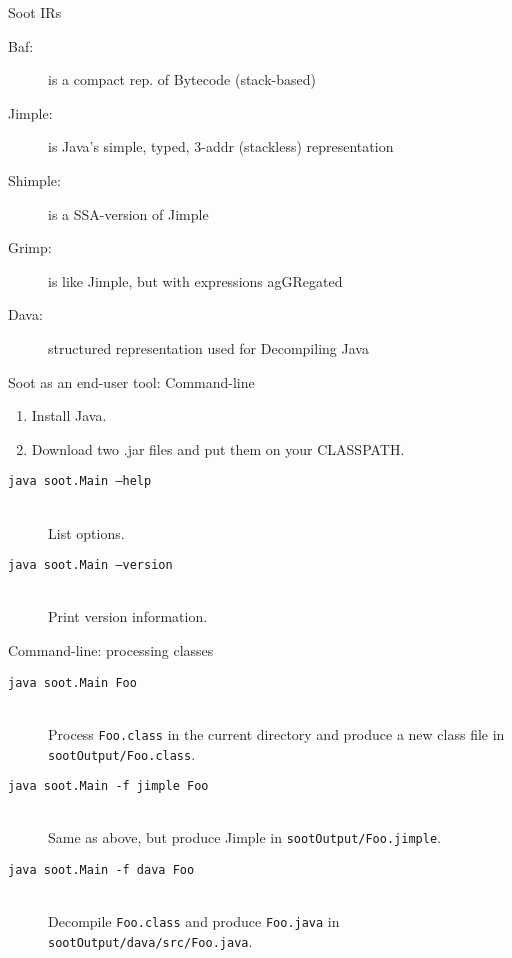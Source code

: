 \begin{slide}{Soot IRs}
\begin{description}
\item[Baf:] is a compact rep. of {\red B}ytecode (stack-based)
\item[Jimple:]  is {\red J}ava's s{\red imple}, typed,  3-addr (stackless) representation 
\item[Shimple:]  is a {\red S}SA-version of {\red Jimple}
\item[Grimp:] is like J{\red imp}le, but with expressions ag{\red GR}egated 
\item[Dava:] structured representation used for {\red D}ecompiling J{\red ava}
\end{description}
\end{slide}

\begin{slide}{Soot as an end-user tool: Command-line}
\begin{enumerate}
\item Install Java.
\item Download two .jar files and put them on your CLASSPATH.
\end{enumerate}
\begin{description}
\item[\texttt{java soot.Main --help}] \hspace{1in} \\
 List options.
\item[\texttt{java soot.Main --version}] \hspace{1in} \\
 Print version information.
\end{description}
\end{slide}

\begin{slide}{Command-line: processing classes}
\begin{description}
\item[\texttt{java soot.Main Foo}] \hspace{1in} \\   
 Process \texttt{Foo.class} in the current directory
 and produce a new class file in
\texttt{sootOutput/Foo.class}.
\item[\texttt{java soot.Main -f jimple Foo}] \hspace{1in} \\
Same as above, but produce Jimple in  \texttt{sootOutput/Foo.jimple}.
\item[\texttt{java soot.Main -f dava Foo}] \hspace{1in} \\
Decompile \texttt{Foo.class} and produce \texttt{Foo.java} in 
\texttt{sootOutput/dava/src/Foo.java}.
\end{description}
\end{slide}

